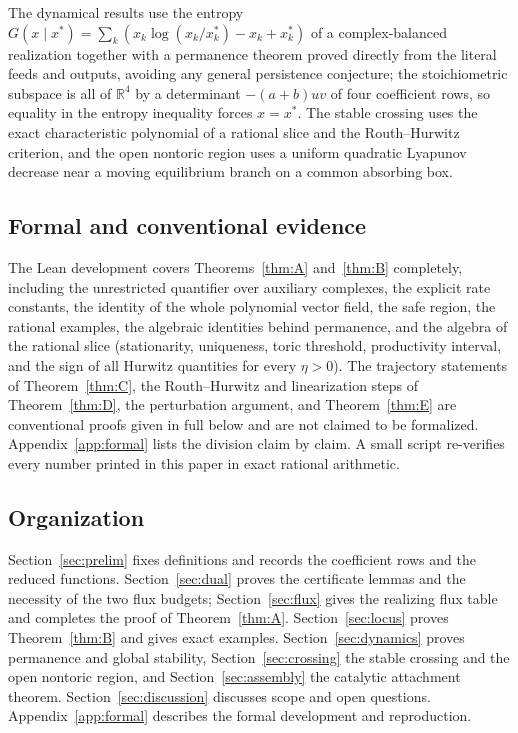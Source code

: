 \documentclass[11pt,a4paper]{article}
\theoremstyle{plain}
\theoremstyle{definition}
\theoremstyle{remark}
\newcommand{\R}{\mathbb{R}}
\newcommand{\xs}{x^{*}}
\begin{document}
The dynamical results use the entropy $G(x\mid\xs)=\sum_k(x_k\log(x_k/x_k^*)-x_k+x_k^*)$ of a complex-balanced realization together with a permanence theorem proved directly from the literal feeds and outputs, avoiding any general persistence conjecture; the stoichiometric subspace is all of $\R^4$ by a determinant $-(a+b)uv$ of four coefficient rows, so equality in the entropy inequality forces $x=\xs$. The stable crossing uses the exact characteristic polynomial of a rational slice and the Routh--Hurwitz criterion, and the open nontoric region uses a uniform quadratic Lyapunov decrease near a moving equilibrium branch on a common absorbing box.

\subsection{Formal and conventional evidence}\label{sec:evidence}

The Lean development covers Theorems~\ref{thm:A} and~\ref{thm:B} completely, including the unrestricted quantifier over auxiliary complexes, the explicit rate constants, the identity of the whole polynomial vector field, the safe region, the rational examples, the algebraic identities behind permanence, and the algebra of the rational slice (stationarity, uniqueness, toric threshold, productivity interval, and the sign of all Hurwitz quantities for every $\eta>0$). The trajectory statements of Theorem~\ref{thm:C}, the Routh--Hurwitz and linearization steps of Theorem~\ref{thm:D}, the perturbation argument, and Theorem~\ref{thm:E} are conventional proofs given in full below and are not claimed to be formalized. Appendix~\ref{app:formal} lists the division claim by claim. A small script re-verifies every number printed in this paper in exact rational arithmetic.

\subsection{Organization}

Section~\ref{sec:prelim} fixes definitions and records the coefficient rows and the reduced functions. Section~\ref{sec:dual} proves the certificate lemmas and the necessity of the two flux budgets; Section~\ref{sec:flux} gives the realizing flux table and completes the proof of Theorem~\ref{thm:A}. Section~\ref{sec:locus} proves Theorem~\ref{thm:B} and gives exact examples. Section~\ref{sec:dynamics} proves permanence and global stability, Section~\ref{sec:crossing} the stable crossing and the open nontoric region, and Section~\ref{sec:assembly} the catalytic attachment theorem. Section~\ref{sec:discussion} discusses scope and open questions. Appendix~\ref{app:formal} describes the formal development and reproduction.
\end{document}

